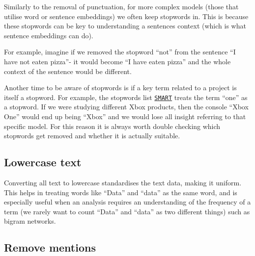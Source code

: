 \documentclass[
  letterpaper,
  DIV=11,
  numbers=noendperiod]{scrreprt}
\begin{document}
\begin{tcolorbox}[enhanced jigsaw, colback=white, opacitybacktitle=0.6, coltitle=black, left=2mm, breakable, bottomtitle=1mm, toptitle=1mm, toprule=.15mm, colframe=quarto-callout-tip-color-frame, titlerule=0mm, title=\textcolor{quarto-callout-tip-color}{\faLightbulb}\hspace{0.5em}{Warning on stopword removal}, colbacktitle=quarto-callout-tip-color!10!white, rightrule=.15mm, bottomrule=.15mm, arc=.35mm, opacityback=0, leftrule=.75mm]

Similarly to the removal of punctuation, for more complex models (those
that utilise word or sentence embeddings) we often keep stopwords in.
This is because these stopwords can be key to understanding a sentences
context (which is what sentence embeddings can do).

For example, imagine if we removed the stopword ``not'' from the
sentence ``I have not eaten pizza''- it would become ``I have eaten
pizza'' and the whole context of the sentence would be different.

Another time to be aware of stopwords is if a key term related to a
project is itself a stopword. For example, the stopwords list
\href{https://search.r-project.org/CRAN/refmans/stopwords/html/data_stopwords_smart.html}{\texttt{SMART}}
treats the term ``one'' as a stopword. If we were studying different
Xbox products, then the console ``Xbox One'' would end up being ``Xbox''
and we would lose all insight referring to that specific model. For this
reason it is always worth double checking which stopwords get removed
and whether it is actually suitable.

\end{tcolorbox}

\subsection{Lowercase text}\label{lowercase-text}

Converting all text to lowercase standardises the text data, making it
uniform. This helps in treating words like ``Data'' and ``data'' as the
same word, and is especially useful when an analysis requires an
understanding of the frequency of a term (we rarely want to count
``Data'' and ``data'' as two different things) such as bigram networks.

\subsection{Remove mentions}\label{remove-mentions}
\end{document}
